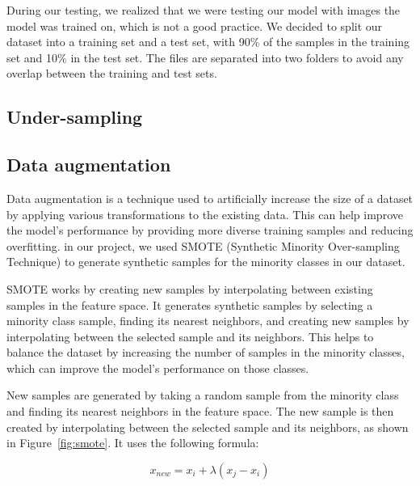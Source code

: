 \label{subsubsec:remaking_dataset}

During our testing, we realized that we were testing our model with images the model was trained on, which is not a good practice. We decided to
split our dataset into a training set and a test set, with 90\% of the samples in the training set and 10\% in the test set. The files are separated
into two folders to avoid any overlap between the training and test sets.

\subsection{Under-sampling}
\label{subsec:under_sampling}


\subsection{Data augmentation}
\label{subsec:data_augmentation}

\label{subsubsec:smote}

Data augmentation is a technique used to artificially increase the size of a dataset by applying various transformations to the existing data.
This can help improve the model's performance by providing more diverse training samples and reducing overfitting. in our project, we used SMOTE
(Synthetic Minority Over-sampling Technique) to generate synthetic samples for the minority classes in our dataset.

SMOTE works by creating new samples by interpolating between existing samples in the feature space. It generates synthetic samples by selecting
a minority class sample, finding its nearest neighbors, and creating new samples by interpolating between the selected sample and its neighbors.
This helps to balance the dataset by increasing the number of samples in the minority classes, which can improve the model's performance on those
classes.

New samples are generated by taking a random sample from the minority class and finding its nearest neighbors in the feature space. The new sample
is then created by interpolating between the selected sample and its neighbors, as shown in Figure~\ref{fig:smote}. It uses the following formula:

\begin{equation}
	x_{new} = x_{i} + \lambda (x_{j} - x_{i})
\end{equation}

